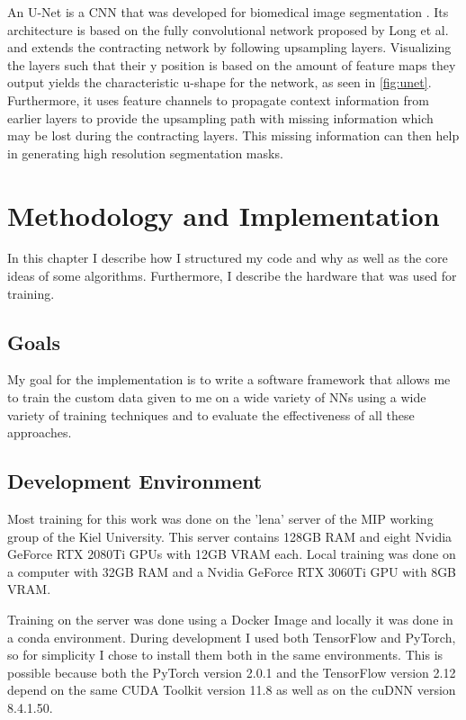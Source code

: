 \documentclass[10pt]{book}
\newcommand{\figureref}[1]{\autoref{#1}}
\begin{document}
An U-Net is a \ac{CNN} that was developed for biomedical image segmentation \cite{DBLP:journals/corr/RonnebergerFB15}. Its architecture is based on the fully convolutional network proposed by Long et al. \cite{DBLP:journals/corr/LongSD14} and extends the contracting network by following upsampling layers. Visualizing the layers such that their y position is based on the amount of feature maps they output yields the characteristic u-shape for the network, as seen in \figureref{fig:unet}. Furthermore, it uses feature channels to propagate context information from earlier layers to provide the upsampling path with missing information which may be lost during the contracting layers. This missing information can then help in generating high resolution segmentation masks.

\chapter{Methodology and Implementation}
\label{chap:implement}

In this chapter I describe how I structured my code and why as well as the core ideas of some algorithms. Furthermore, I describe the hardware that was used for training.

\section{Goals}


My goal for the implementation is to write a software framework that allows me to train the custom data given to me on a wide variety of \acp{NN} using a wide variety of training techniques and to evaluate the effectiveness of all these approaches.

\section{Development Environment}

Most training for this work was done on the 'lena' server of the \ac{MIP} working group of the Kiel University. This server contains 128GB RAM and eight Nvidia GeForce RTX 2080Ti \acp{GPU} with 12GB VRAM each. Local training was done on a computer with 32GB RAM and a Nvidia GeForce RTX 3060Ti \ac{GPU} with 8GB VRAM.

Training on the server was done using a Docker Image and locally it was done in a conda environment. During development I used both TensorFlow and PyTorch, so for simplicity I chose to install them both in the same environments. This is possible because both the PyTorch version 2.0.1 and the TensorFlow version 2.12 depend on the same \ac{CUDA} Toolkit version 11.8 as well as on the \ac{cuDNN} version 8.4.1.50.
\end{document}
